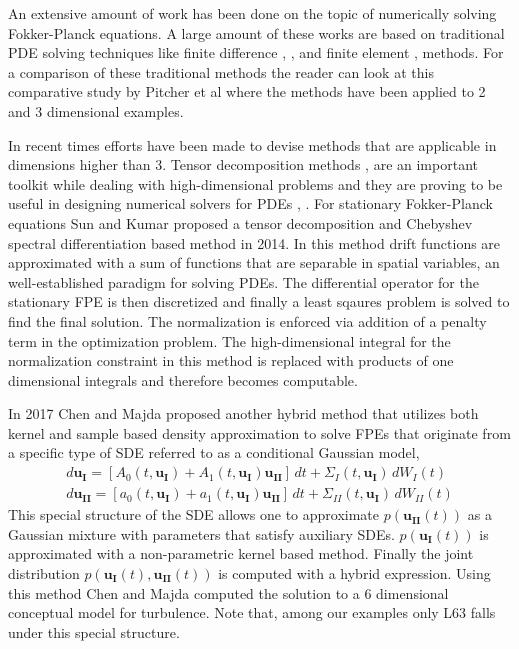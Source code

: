 An extensive amount of work has been done on the topic of numerically solving Fokker-Planck equations. A large amount of these works are based on traditional PDE solving techniques like finite difference \cite{berezin1987conservative}, \cite{whitney1970finite}, \cite{sepehrian2015numerical} and finite element \cite{naprstek2014finite}, \cite{masud2005application} methods. For a comparison of these traditional methods the reader can look at this comparative study \cite{pichler2013numerical} by Pitcher et al where the methods have been applied to 2 and 3 dimensional examples. 


In recent times efforts have been made to devise methods that are applicable in dimensions higher than 3. Tensor decomposition methods  \cite{Hackbusch2005HierarchicalKT}, \cite{kolda2009tensor} are an important toolkit while dealing with high-dimensional problems and they are proving to be useful in designing numerical solvers for PDEs \cite{ballani2013projection}, \cite{kressner2010krylov}.  For stationary Fokker-Planck equations Sun and Kumar proposed a tensor decomposition and Chebyshev spectral differentiation based method \cite{sun2014numerical} in 2014. In this method drift functions are approximated with a sum of functions that are separable in spatial variables, an well-established paradigm for solving PDEs. The differential operator for the stationary FPE is then discretized and finally a least sqaures problem is solved to find the final solution. The normalization is enforced via addition of a  penalty term in the optimization problem. The high-dimensional integral for the normalization constraint in this method is replaced with  products of one dimensional integrals and therefore becomes computable.   

In 2017 Chen and Majda proposed another hybrid method \cite{chen2018efficient} that utilizes both kernel and sample based density approximation to solve FPEs that originate from a specific type of SDE referred to as a conditional Gaussian model,
\begin{equation}
\begin{aligned}
    d\mathbf{u_I} = [A_0(t, \mathbf{u_I}) + A_1(t, \mathbf{u_I})\mathbf{u_{II}}]\,dt + \Sigma_I(t, \mathbf{u_I})\,dW_I(t)\\
    d\mathbf{u_{II}} = [a_0(t, \mathbf{u_I}) + a_1(t, \mathbf{u_I})\mathbf{u_{II}}]\,dt + \Sigma_{II}(t, \mathbf{u_I})\,dW_{II}(t)\label{eq:conditional-Gaussian-SDE}
\end{aligned}
\end{equation}
This special structure of the SDE allows one to approximate $p(\mathbf{u_{II}}(t))$ as a Gaussian mixture with parameters that satisfy auxiliary SDEs. $p(\mathbf{u_I}(t))$ is approximated with a non-parametric kernel based method. Finally the joint distribution $p(\mathbf{u_I}(t), \mathbf{u_{II}}(t))$ is computed with a hybrid expression. Using this method Chen and Majda computed the solution to a 6 dimensional conceptual model for turbulence. Note that, among our examples only L63 falls under this special  structure.

